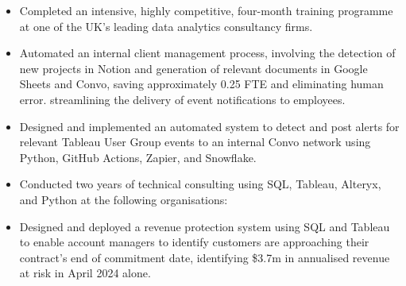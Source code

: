 \documentclass[10pt,a4paper,ragged2e,withhyper]{altacv}
\begin{document}
\begin{paracol}{2}

\begin{itemize}
\item Completed an intensive, highly competitive, four-month training programme at one of the UK’s leading data analytics consultancy firms.
\item Automated an internal client management process, involving the detection of new projects in Notion and generation of relevant documents in Google Sheets and Convo, saving approximately 0.25 FTE and eliminating human error.
streamlining the delivery of event notifications to employees.
\item Designed and implemented an automated system to detect and post alerts for relevant Tableau User Group events to an internal Convo network using Python, GitHub Actions, Zapier, and Snowflake.
\item Conducted two years of technical consulting using SQL, Tableau, Alteryx, and Python at the following organisations:

\medskip
{}

\end{itemize}

\divider

\begin{itemize}
\item Designed and deployed a revenue protection system using SQL and Tableau to enable account managers to identify customers are approaching their contract's end of commitment date, identifying \$3.7m in annualised revenue at risk in April 2024 alone.

\end{itemize}


\end{paracol}
\end{document}
